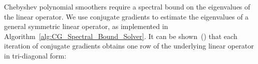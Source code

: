 %
Chebyshev polynomial smoothers require a spectral bound on the
eigenvalues of the linear operator. We use conjugate gradients to estimate the eigenvalues of a general symmetric linear operator, as implemented in Algorithm~\ref{alg:CG_Spectral_Bound_Solver}.  It can be shown~(\cite{scales1989use}) that each iteration of conjugate gradients obtains one row of the underlying linear operator in tri-diagonal form:

